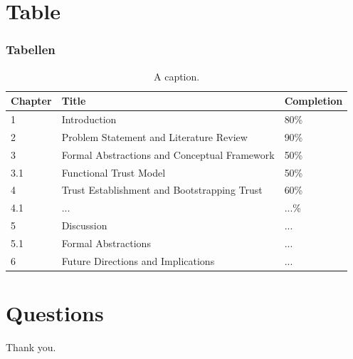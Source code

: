 \documentclass[aspectratio=169] {beamer}
\begin{document}
\section{Table}

\begin{frame}\frametitle{Tabellen}
\begin{table}[h]
\scriptsize
\centering
\caption{A caption.}
\begin{tabular}{lll}
Chapter & Title & Completion \\
\hline
1 & Introduction  & 80\% \\
2 & Problem Statement and Literature Review & 90\%  \\
3 & Formal Abstractions and Conceptual Framework& 50\% \\
3.1 & Functional Trust Model & 50\% \\
4 & Trust Establishment and Bootstrapping Trust &  60\%\\
4.1 & ... & ...\%\\
5 & Discussion & ...\\
5.1 & Formal Abstractions & ...\\ %
6 & Future Directions and Implications & ... \\
\end{tabular}
\end{table}
\end{frame}

\section*{Questions}

\begin{frame}
\centering
\Large
Thank you.
\end{frame}
\end{document}
